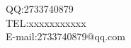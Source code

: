 \documentclass{ctexart}
\begin{document}
\begin{flushright}
QQ:2733740879\\
TEL:xxxxxxxxxxx\\
E-mail:2733740879@qq.com\\

\end{flushright}
\end{document}

